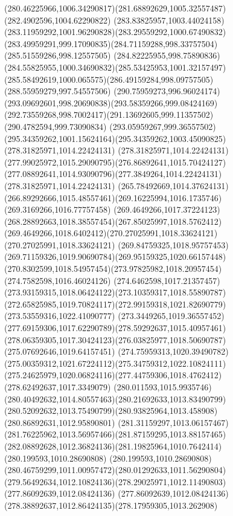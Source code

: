 {{	\curveto(280.46225966,1006.34290817)(281.68892629,1005.32557487)(282.4902596,1004.62290822)
	\curveto(283.83825957,1003.44024158)(283.11959292,1001.96290828)(283.29559292,1000.67490832)
	\curveto(283.49959291,999.17090835)(284.71159288,998.33757504)(285.51559286,998.12557505)
	\curveto(284.82225955,998.75890836)(284.55825955,1000.34690832)(285.53425953,1001.32157497)
	\curveto(285.58492619,1000.065575)(286.49159284,998.09757505)(288.55959279,997.54557506)
	\curveto(290.75959273,996.96024174)(293.09692601,998.20690838)(293.58359266,999.08424169)
	\curveto(292.73559268,998.7002417)(291.13692605,999.11357502)(290.4782594,999.73090834)
	\curveto(293.05959267,999.36557502)(295.34359262,1001.15624164)(295.34359262,1003.45090825)
	\moveto(278.31825971,1014.22424131)
	\curveto(278.31825971,1014.22424131)(277.99025972,1015.29090795)(276.86892641,1015.70424127)
	\curveto(277.08892641,1014.93090796)(277.3849264,1014.22424131)(278.31825971,1014.22424131)
	\moveto(265.78492669,1014.37624131)
	\curveto(266.89292666,1015.48557461)(269.16225994,1016.1735746)(269.3169266,1016.77757458)
	\curveto(269.4649266,1017.37224123)(268.28892663,1018.38557454)(267.85025997,1018.5762412)
	\curveto(269.4649266,1018.6402412)(270.27025991,1018.33624121)(270.27025991,1018.33624121)
	\curveto(269.84759325,1018.95757453)(269.71159326,1019.90690784)(269.95159325,1020.66157448)
	\curveto(270.8302599,1018.54957454)(273.97825982,1018.20957454)(274.7582598,1016.46024126)
	\curveto(274.6462598,1017.21357457)(273.93159315,1018.06424122)(273.10359317,1018.55890787)
	\curveto(272.65825985,1019.70824117)(272.99159318,1021.82690779)(273.53559316,1022.41090777)
	\curveto(273.3449265,1019.36557452)(277.69159306,1017.62290789)(278.59292637,1015.40957461)
	\curveto(278.06359305,1017.30424123)(276.03825977,1018.50690787)(275.07692646,1019.64157451)
	\curveto(274.75959313,1020.39490782)(275.00359312,1021.67224112)(275.34759312,1022.10824111)
	\curveto(275.24625979,1020.06824116)(277.44759306,1018.4762412)(278.62492637,1017.3349079)
	\curveto(280.011593,1015.9935746)(280.40492632,1014.80557463)(280.21692633,1013.83490799)
	\curveto(280.52092632,1013.75490799)(280.93825964,1013.458908)(280.86892631,1012.95890801)
	\curveto(281.31159297,1013.06157467)(281.76225962,1013.56957466)(281.87159295,1013.88157465)
	\curveto(282.08892628,1012.36824136)(281.19825964,1010.7642414)(280.199593,1010.28690808)
	\curveto(280.199593,1010.28690808)(280.46759299,1011.00957472)(280.01292633,1011.56290804)
	\curveto(279.56492634,1012.10824136)(278.29025971,1012.11490803)(277.86092639,1012.08424136)
	\curveto(277.86092639,1012.08424136)(278.38892637,1012.86424135)(278.17959305,1013.262908)
}}
